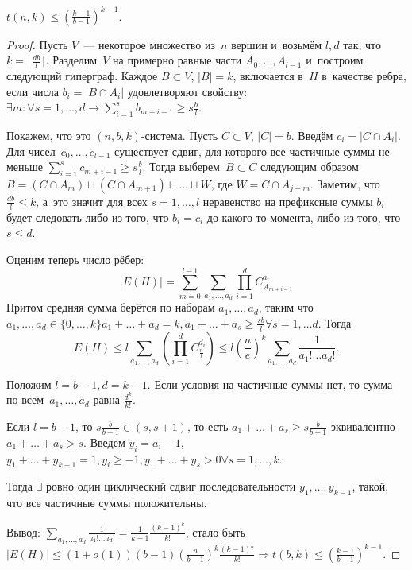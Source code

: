 \documentclass{article}
\begin{document}
\begin{theorem}
	$t(n,k) \le \left( \frac{k-1}{b-1} \right)^{k-1}$.
\end{theorem}
\begin{proof}
	Пусть $V$~--- некоторое множество из~$n$ вершин и~возьмём $l, d$ так, что $k =
	\lceil \frac{db}{l} \rceil$. Разделим~$V$ на примерно равные части $A_0,
	\ldots, A_{l-1}$ и~построим следующий гиперграф. Каждое $B \subset V$,
	$|B| = k$, включается в~$H$ в~качестве ребра, если числа $b_i = |B \cap A_i|$
	удовлетворяют свойству: $\exists m: \forall s = 1, \ldots, d \rightarrow
	\sum\limits_{i=1}^s b_{m+i-1} \ge s \frac{b}{l}$.

	Покажем, что это $(n,b,k)$-система. Пусть $C \subset V$, $|C| = b$. Введём
	$c_i = |C \cap A_i|$. Для чисел~$c_0, \ldots, c_{l-1}$ существует сдвиг, для
	которого все частичные суммы не меньше $\sum\limits_{i=1}^s c_{m+i-1} \ge s
	\frac{b}{l}$. Тогда выберем~$B \subset C$ следующим образом $B = (C \cap A_m)
	\sqcup (C \cap A_{m+1}) \sqcup \ldots \sqcup W$, где $W = C \cap A_{j+m}$.
	Заметим, что $\frac{db}{l} \le k$, а~это значит для всех $s = 1, \ldots, l$
	неравенство на префиксные суммы $b_i$ будет следовать либо из того, что
	$b_i = c_i$ до какого-то момента, либо из того, что $s \le d$.

	Оценим теперь число рёбер:
		$$|E(H)| = \sum_{m=0}^{l-1} \sum_{a_1, \ldots, a_d} \prod_{i=1}^d
		C_{A_{m+i-1}}^{a_i}$$
	Притом средняя сумма берётся по наборам $a_1, \ldots, a_d$, таким что $a_1,
	\ldots, a_d \in \{0,\ldots,k\} a_1 + \ldots + a_d = k, a_1 + \ldots + a_s \ge
	\frac{sb}{l} \forall s = 1, \ldots d$. Тогда
	$$ E(H) \le l \sum_{a_1,\ldots,a_d} \left(\prod_{i=1}^{d}
	C_{\frac{n}{l}}^{d_i}\right) \le l \left( \frac{n}{e} \right)^k
	\sum_{a_1,\ldots,a_d} \frac{1}{a_1! \ldots a_d!}. $$

	Положим $l = b - 1, d = k - 1$. Если условия на частичные суммы нет, то сумма
	по всем~$a_1, \ldots, a_d$ равна $\frac{d^k}{k!}$.

	Если $l = b - 1$, то $s \frac{b}{b-1} \in (s,s+1)$, то есть $a_1 + \ldots +
	a_s \ge s \frac{b}{b-1}$ эквивалентно $a_1 + \ldots + a_s > s$. Введем $y_i =
	a_i - 1$, $y_1 + \ldots + y_{k-1} = 1, y_i \ge -1, y_1 + \ldots + y_s > 0
	\forall s = 1, \ldots, k$.

	Тогда $\exists$ ровно один циклический сдвиг последовательности $y_1, \ldots,
	y_{k-1}$, такой, что все частичные суммы положительны.

	Вывод: $\sum\limits_{a_1,\ldots,a_d} \frac{1}{a_1!\ldots a_d!} = \frac{1}{k-1}
	\frac{(k-1)^k}{k!}$, стало быть $|E(H)| \le (1 + o(1)) (b - 1)\left(
	\frac{n}{b-1}\right)^k \frac{(k-1)^k}{k!} \Rightarrow t(b,k) \le \left(
	\frac{k-1}{b-1} \right)^{k-1}$.
\end{proof}
\end{document}
